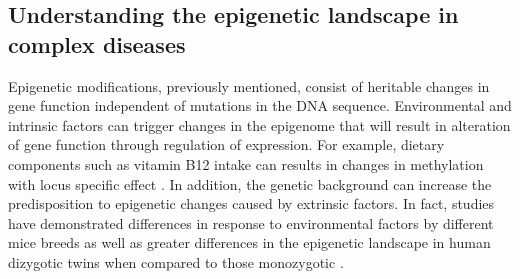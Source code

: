 \subsection{Understanding the epigenetic landscape in complex diseases}
Epigenetic modifications, previously mentioned, consist of heritable changes in gene function independent of mutations in the DNA sequence\parencite{Feil2012}. Environmental and intrinsic factors can trigger changes in the epigenome that will result in alteration of gene function through regulation of expression. For example, dietary components such as vitamin B12 intake can results in changes in methylation with locus specific effect \parencite{Wolff1998}. In addition, the genetic background can increase the predisposition to epigenetic changes caused by extrinsic factors. In fact, studies have demonstrated differences in response to environmental factors by different mice breeds as well as greater differences in the epigenetic landscape in human dizygotic twins when compared to those monozygotic \parencite{Pogribny2009,Kaminsky2009}.

